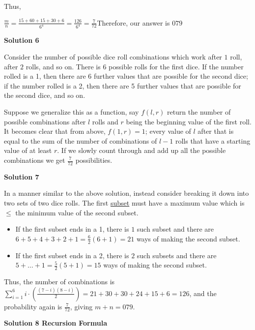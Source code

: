 \begin{enumerate}
 Thus, 

 $\frac{m}{n} = \frac{15 + 60 + 15 + 30 + 6}{6^4} = \frac{126}{6^4} = \frac{7}{72}$Therefore, our answer is $\boxed{079}$




\textbf{Solution 6}

Consider the number of possible dice roll combinations which work after $1$ roll, after $2$ rolls, and so on. There is 6 possible rolls for the first dice. If the number rolled is a 1, then there are 6 further values that are possible for the second dice; if the number rolled is a 2, then there are 5 further values that are possible for the second dice, and so on. 

 Suppose we generalize this as a function, say $f(l,r)$ return the number of possible combinations after $l$ rolls and $r$ being the beginning value of the first roll. It becomes clear that from above, $f(1,r) = 1$; every value of $l$ after that is equal to the sum of the number of combinations of $l - 1$ rolls that have a starting value of at least $r$. If we slowly count through and add up all the possible combinations we get $\frac{7}{72}$ possibilities.

 



\textbf{Solution 7}

In a manner similar to the above solution, instead consider breaking it down into two sets of two dice rolls. The first \href{https://artofproblemsolving.com/wiki/index.php?title=Subset}{subset} must have a maximum value which is $\le$ the minimum value of the second subset. 

 
            \begin{itemize}
        \item If the first subset ends in a 1, there is $1$ such subset and there are $6 + 5 + 4 + 3 + 2 + 1 = \frac{6}{2}(6 + 1) = 21$ ways of making the second subset.
        \item If the first subset ends in a 2, there is $2$ such subsets and there are $5 + \ldots + 1 = \frac{5}{2}(5 + 1) = 15$ ways of making the second subset.
            \end{itemize}
            Thus, the number of combinations is $\sum_{i=1}^6 i \cdot \left(\frac{(7 - i)(8 - i)}{2}\right) = 21 + 30 + 30 + 24 + 15 + 6 = 126$, and the probability again is $\frac7{72}$, giving $m+n=\boxed{079}$.

 



\textbf{Solution 8 Recursion Formula}


\end{enumerate}
